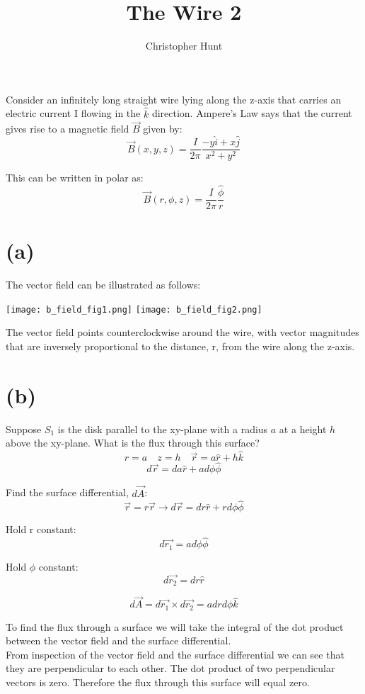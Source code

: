 \documentclass[11pt]{article}
\title{The Wire 2}
\author{Christopher Hunt}
\date{}
\begin{document}
\pagestyle{fancy}
\fancyhf{}
\rhead{\thepage}
\maketitle

Consider an infinitely long straight wire lying along the z-axis that carries
an electric current I flowing in the $\hat{k}$ direction. Ampere’s Law says that the current gives rise to a magnetic field $\vec{B}$ given by:
$$\vec{B}(x,y,z)=\frac{I}{2\pi}\frac{-y\hat{i}+x\hat{j}}{x^2+y^2}$$

This can be written in polar as:
$$\vec{B}(r,\phi,z)=\frac{I}{2\pi}\frac{\hat{\phi}}{r}$$

\section*{(a)}
The vector field can be illustrated as follows:
\begin{center}
    \texttt{[image: b\_field\_fig1.png]}
    \texttt{[image: b\_field\_fig2.png]}
\end{center}
The vector field points counterclockwise around the wire, with vector magnitudes that are inversely proportional to the distance, r, from the wire along the z-axis.

\section*{(b)}
Suppose $S_1$ is the disk parallel to the xy-plane with a radius $a$ at a height $h$ above the xy-plane. What is the flux through this surface?
$$r = a \quad z = h \quad \vec{r} = a\hat{r} + h\hat{k}$$
$$d\vec{r} = da\hat{r}+ad\phi\hat{\phi}$$

Find the surface differential, $d\vec{A}$:
$$\vec{r} = r\vec{r} \rightarrow d\vec{r} = dr\hat{r} + rd\phi \hat{\phi}$$

Hold r constant:
$$d\vec{r_1} = ad\phi\hat{\phi}$$

Hold $\phi$ constant:
$$d\vec{r_2} = dr\hat{r}$$


$$d\vec{A} = d\vec{r_1} \times d\vec{r_2} = adrd\phi\hat{k}$$

To find the flux through a surface we will take the integral of the dot product between the vector field and the surface differential.
\\

From inspection of the vector field and the surface differential we can see that they are perpendicular to each other. The dot product of two perpendicular vectors is zero. Therefore the flux through this surface will equal zero.
\end{document}

